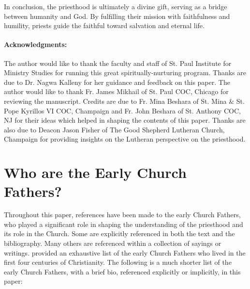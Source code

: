 \documentclass[12pt,doc]{apa7}   	%
\begin{document}
In conclusion, the priesthood is ultimately a divine gift, serving as a bridge between humanity and God. By fulfilling their mission with faithfulness and humility, priests guide the faithful toward salvation and eternal life.

\vskip 0.5cm
\paragraph{Acknowledgments:} The author would like to thank the faculty and staff of St. Paul Institute for Ministry Studies for running this great spiritually-nurturing program.  Thanks are due to Dr. Nagwa Kalleny for her guidance and feedback on this paper. The author would like to thank Fr. James Mikhail of St. Paul COC, Chicago for reviewing the manuscript. Credits are due to Fr. Mina Beshara of St. Mina \& St. Pope Kyrillos VI COC, Champaign and Fr. John Beshara of St. Anthony COC, NJ for their ideas which helped in shaping the contents of this paper. Thanks are also due to Deacon Jason Fisher of The Good Shepherd Lutheran Church, Champaign for providing insights on the Lutheran perspective on the priesthood.

\newpage{}
\appendix{}
\section{Who are the Early Church Fathers?}\label{early_fathers}
Throughout this paper, references have been made to the early Church Fathers, who played a significant role in shaping the understanding of the priesthood and its role in the Church.  Some are explicitly referenced in both the text and the bibliography.  Many others are referenced within a collection of sayings or writings. \citet{early_church_akin} provided an exhaustive list of the early Church Fathers who lived in the first four centuries of Christianity.  The following is a much shorter list of the early Church Fathers, with a brief bio, referenced explicitly or implicitly, in this paper:
\end{document}
